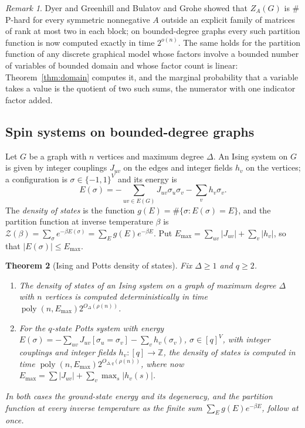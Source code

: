 \documentclass[11pt,reqno]{amsart}
\numberwithin{equation}{section}
\theoremstyle{plain}
\newtheorem{theorem}{Theorem}[section]
\theoremstyle{definition}
\theoremstyle{remark}
\newtheorem{remark}[theorem]{Remark}
\DeclareMathOperator{\poly}{poly}
\newcommand{\Z}{\mathbb{Z}}
\newcommand{\rhon}{\rho}
\begin{document}
\begin{remark}
Dyer and Greenhill \cite{DG00} and Bulatov and Grohe \cite{BG05} showed that
$Z_{A}(G)$ is $\#$P-hard for every symmetric nonnegative $A$ outside an
explicit family of matrices of rank at most two in each block; on
bounded-degree graphs every such partition function is now computed exactly in
time $2^{o(n)}$. The same holds for the partition function of any discrete
graphical model whose factors involve a bounded number of variables of bounded
domain and whose factor count is linear: Theorem~\ref{thm:domain} computes it,
and the marginal probability that a variable takes a value is the quotient of
two such sums, the numerator with one indicator factor added.
\end{remark}

\subsection{Spin systems on bounded-degree graphs}\label{ssec:spin}
Let $G$ be a graph with $n$ vertices and maximum degree $\Delta$. An Ising
system on $G$ is given by integer couplings $J_{uv}$ on the edges and integer
fields $h_v$ on the vertices; a configuration is $\sigma\in\{-1,1\}^{V}$ and its
energy is
\begin{equation}\label{eq:ising}
  E(\sigma)=-\sum_{uv\in E(G)}J_{uv}\sigma_u\sigma_v-\sum_{v}h_v\sigma_v .
\end{equation}
The \emph{density of states} is the function $g(E)=\#\{\sigma:E(\sigma)=E\}$, and
the partition function at inverse temperature $\beta$ is
$\mathcal Z(\beta)=\sum_\sigma e^{-\beta E(\sigma)}=\sum_Eg(E)e^{-\beta E}$. Put
$E_{\max}=\sum_{uv}|J_{uv}|+\sum_v|h_v|$, so that $|E(\sigma)|\le E_{\max}$.

\begin{theorem}[Ising and Potts density of states]\label{thm:ising}
Fix $\Delta\ge1$ and $q\ge2$.
\begin{enumerate}[label=(\roman*),leftmargin=2.2em]
\item\label{it:isingmodel} The density of states of an Ising system on a graph of
maximum degree $\Delta$ with $n$ vertices is computed deterministically in time
$\poly(n,E_{\max})2^{O_\Delta(\rhon(n))}$.
\item\label{it:potts} For the $q$-state Potts system with energy
$E(\sigma)=-\sum_{uv}J_{uv}[\sigma_u=\sigma_v]-\sum_vh_v(\sigma_v)$,
$\sigma\in[q]^V$, with integer couplings and integer fields $h_v:[q]\to\Z$, the
density of states is computed in time $\poly(n,E_{\max})2^{O_{\Delta,q}(\rhon(n))}$,
where now $E_{\max}=\sum|J_{uv}|+\sum_v\max_s|h_v(s)|$.
\end{enumerate}
In both cases the ground-state energy and its degeneracy, and the partition
function at every inverse temperature as the finite sum $\sum_Eg(E)e^{-\beta E}$,
follow at once.
\end{theorem}
\end{document}
